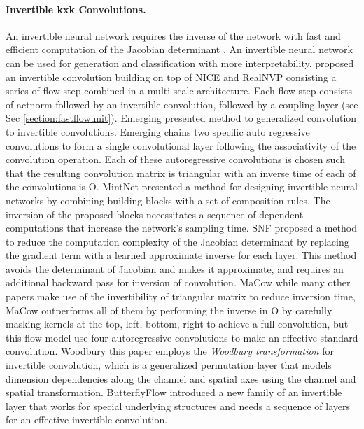 \documentclass[a4paper,twoside]{article}
\theoremstyle{definition}
\begin{document}
\paragraph{Invertible kxk Convolutions.}
An invertible neural network requires the inverse of the network with fast and efficient computation of the Jacobian determinant \citep{song2019mintnet}. An invertible neural network can be used for generation and classification with more interpretability. \citep{kingma2018glow} proposed an invertible  convolution building on top of NICE \citep{dinh2014nice}  and RealNVP \citep{dinh2016density} consisting a series of flow step combined in a multi-scale architecture. Each flow step consists of actnorm followed by an invertible  convolution, followed by a coupling layer (see Sec \ref{section:fastflowunit}). Emerging \citep{hoogeboom2019emerging} presented method to generalized  convolution to invertible  convolutions. Emerging chains two specific auto regressive convolutions \citep{kingma2013auto} to form a single convolutional layer following the associativity of the convolution operation. Each of these autoregressive convolutions is chosen such that the resulting convolution matrix  is triangular with an inverse time of each of the convolutions is O. MintNet \citep{song2019mintnet} presented a method for designing invertible neural networks by combining building blocks with a set of composition rules. The inversion of the proposed blocks necessitates a sequence of dependent computations that increase the network's sampling time. SNF \citep{keller2021self} proposed a method to reduce the computation complexity of the Jacobian determinant by replacing the gradient term with a learned approximate inverse for each layer. This method avoids the determinant of Jacobian and makes it approximate, and requires an additional backward pass for inversion of convolution. MaCow \citep{ma2019macow} while many other papers make use of the invertibility of triangular matrix to reduce inversion time, MaCow outperforms all of them by performing the inverse in O by carefully masking  kernels at the top, left, bottom, right to achieve a full convolution, but this flow model use four autoregressive convolutions to make an effective standard convolution. Woodbury \citep{lu2020woodbury} this paper employs the \emph{Woodbury transformation} for invertible convolution, which is a generalized permutation layer that models dimension dependencies along the channel and spatial axes using the channel and spatial transformation. ButterflyFlow \citep{meng2022butterflyflow} introduced a new family of an invertible layer that works for special underlying structures and needs a sequence of layers for an effective invertible convolution.
\end{document}

